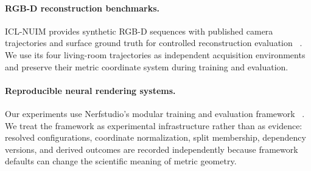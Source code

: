 \paragraph{RGB-D reconstruction benchmarks.}
ICL-NUIM provides synthetic RGB-D sequences with published camera trajectories
and surface ground truth for controlled reconstruction evaluation
~\cite{handa2014benchmark}.  We use its four living-room trajectories as
independent acquisition environments and preserve their metric coordinate
system during training and evaluation.

\paragraph{Reproducible neural rendering systems.}
Our experiments use Nerfstudio's modular training and evaluation framework
~\cite{tancik2023nerfstudio}.  We treat the framework as experimental
infrastructure rather than as evidence: resolved configurations, coordinate
normalization, split membership, dependency versions, and derived outcomes are
recorded independently because framework defaults can change the scientific
meaning of metric geometry.
